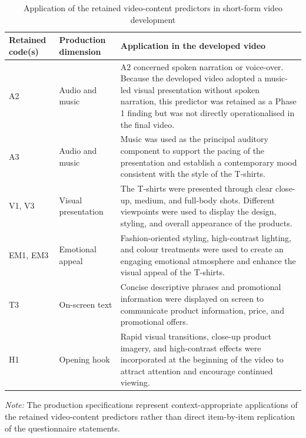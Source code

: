 \documentclass[jtaer,article,submit,moreauthors]{Definitions/mdpi}
\begin{document}
\begin{table}[htbp]
	\caption{Application of the retained video-content predictors in
		short-form video development}
	\label{tab:video_production_specifications}
	
	\centering
	\small
	\renewcommand{\arraystretch}{1.15}
	
	\begin{tabular}{
			@{}
			p{}
			p{}
			p{}
			@{}
		}
		\toprule
		
		\textbf{Retained code(s)} &
		\textbf{Production dimension} &
		\textbf{Application in the developed video} \\
		
		\midrule
		
		A2 &
		Audio and music &
		A2 concerned spoken narration or voice-over. Because the developed video adopted a music-led visual presentation without spoken narration, this predictor was retained as a Phase 1
		finding but was not directly operationalised in the final video. \\
		
		A3 &
		Audio and music &
		Music was used as the principal auditory component to support the
		pacing of the presentation and establish a contemporary mood
		consistent with the style of the T-shirts. \\
		
		V1, V3 &
		Visual presentation &
		The T-shirts were presented through clear close-up, medium, and
		full-body shots. Different viewpoints were used to display the design,
		styling, and overall appearance of the products. \\
		
		EM1, EM3 &
		Emotional appeal &
		Fashion-oriented styling, high-contrast lighting, and colour
		treatments were used to create an engaging emotional atmosphere and
		enhance the visual appeal of the T-shirts. \\
		
		T3 &
		On-screen text &
		Concise descriptive phrases and promotional information were displayed
		on screen to communicate product information, price, and promotional
		offers. \\
		
		H1 &
		Opening hook &
		Rapid visual transitions, close-up product imagery, and high-contrast
		effects were incorporated at the beginning of the video to attract
		attention and encourage continued viewing. \\
		
		\bottomrule
	\end{tabular}
	
	\vspace{1mm}
	
	\begin{minipage}{0.91\textwidth}
		\footnotesize
		\textit{Note:} The production specifications represent
		context-appropriate applications of the retained video-content
		predictors rather than direct item-by-item replication of the
		questionnaire statements.
	\end{minipage}
	
\end{table}
\end{document}
